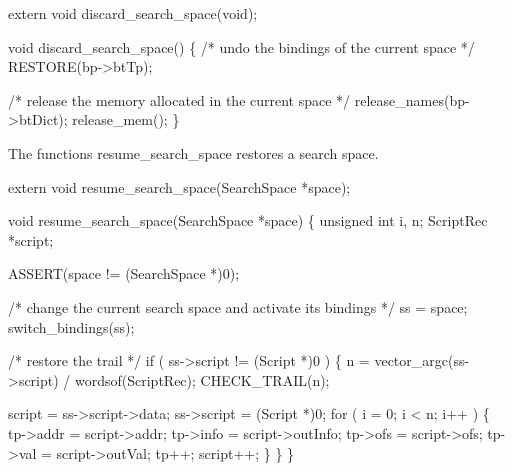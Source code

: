 \nwenddocs{}\plusendmoddef\nwstartdeflinemarkup{}\nwenddeflinemarkup
extern void discard_search_space(void);

\nwendcode{}\nwdocspar
\nwenddocs{}\plusendmoddef\nwstartdeflinemarkup{}\nwenddeflinemarkup
void
discard_search_space()
\{
    /* undo the bindings of the current space */
    RESTORE(bp->btTp);

    /* release the memory allocated in the current space */
    release_names(bp->btDict);
    release_mem();
\}

\nwendcode{}\nwdocspar
The functions {\Tt{}resume{\_}search{\_}space\nwendquote} restores a search space.

\nwenddocs{}\plusendmoddef\nwstartdeflinemarkup{}\nwenddeflinemarkup
extern void resume_search_space(SearchSpace *space);

\nwendcode{}\nwdocspar
\nwenddocs{}\plusendmoddef\nwstartdeflinemarkup{}\nwenddeflinemarkup
void
resume_search_space(SearchSpace *space)
\{
    unsigned int i, n;
    ScriptRec    *script;

    ASSERT(space != (SearchSpace *)0);

    /* change the current search space and activate its bindings */
    ss = space;
    switch_bindings(ss);

    /* restore the trail */
    if ( ss->script != (Script *)0 )
    \{
        n = vector_argc(ss->script) / wordsof(ScriptRec);
        CHECK_TRAIL(n);

        script     = ss->script->data;
        ss->script = (Script *)0;
        for ( i = 0; i < n; i++ )
        \{
            tp->addr = script->addr;
            tp->info = script->outInfo;
            tp->ofs  = script->ofs;
            tp->val  = script->outVal;
            tp++;
            script++;
        \}
    \}
\}

